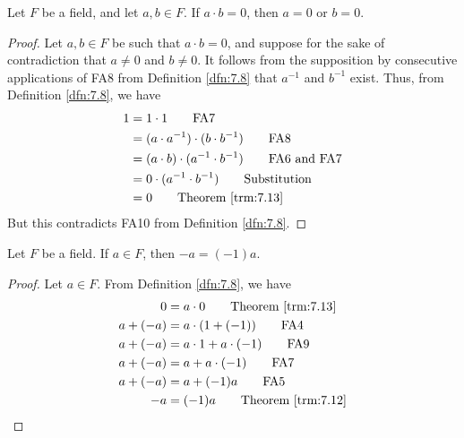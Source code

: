 \documentclass[../main.tex]{subfiles}
\begin{document}
\begin{theorem}\label{trm:7.17}
    Let $F$ be a field, and let $a,b\in F$. If $a\cdot b=0$, then $a=0$ or $b=0$.
    \begin{proof}
        Let $a,b\in F$ be such that $a\cdot b=0$, and suppose for the sake of contradiction that $a\neq 0$ and $b\neq 0$. It follows from the supposition by consecutive applications of FA8 from Definition \ref{dfn:7.8} that $a^{-1}$ and $b^{-1}$ exist. Thus, from Definition \ref{dfn:7.8}, we have
        \begin{align*}
            1 &= 1\cdot 1\tag*{FA7}\\
            &= (a\cdot a^{-1})\cdot(b\cdot b^{-1})\tag*{FA8}\\
            &= (a\cdot b)\cdot(a^{-1}\cdot b^{-1})\tag*{FA6 and FA7}\\
            &= 0\cdot(a^{-1}\cdot b^{-1})\tag*{Substitution}\\
            &= 0\tag*{Theorem \ref{trm:7.13}}
        \end{align*}
        But this contradicts FA10 from Definition \ref{dfn:7.8}.
    \end{proof}
\end{theorem}

\begin{lemma}\label{lem:7.18}
    Let $F$ be a field. If $a\in F$, then $-a=(-1)a$.
    \begin{proof}
        Let $a\in F$. From Definition \ref{dfn:7.8}, we have
        \begin{align*}
            0 &= a\cdot 0\tag*{Theorem \ref{trm:7.13}}\\
            a+(-a) &= a\cdot(1+(-1))\tag*{FA4}\\
            a+(-a) &= a\cdot 1+a\cdot(-1)\tag*{FA9}\\
            a+(-a) &= a+a\cdot(-1)\tag*{FA7}\\
            a+(-a) &= a+(-1)a\tag*{FA5}\\
            -a &= (-1)a\tag*{Theorem \ref{trm:7.12}}
        \end{align*}
    \end{proof}
\end{lemma}
\end{document}

